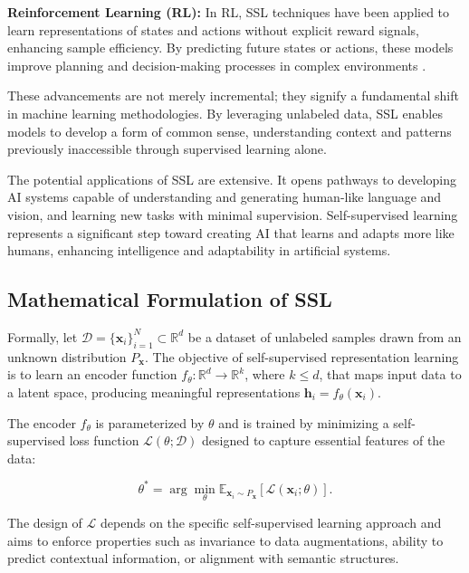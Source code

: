 \textbf{Reinforcement Learning (RL):} In RL, SSL techniques have been applied to learn representations of states and actions without explicit reward signals, enhancing sample efficiency. By predicting future states or actions, these models improve planning and decision-making processes in complex environments \citep{schwarzer2021pretraining}.

These advancements are not merely incremental; they signify a fundamental shift in machine learning methodologies. By leveraging unlabeled data, SSL enables models to develop a form of common sense, understanding context and patterns previously inaccessible through supervised learning alone.

The potential applications of SSL are extensive. It opens pathways to developing AI systems capable of understanding and generating human-like language and vision, and learning new tasks with minimal supervision. Self-supervised learning represents a significant step toward creating AI that learns and adapts more like humans, enhancing intelligence and adaptability in artificial systems.



\subsection{Mathematical Formulation of SSL}

Formally, let \( \mathcal{D} = \{ \mathbf{x}_i \}_{i=1}^N \subset \mathbb{R}^d \) be a dataset of unlabeled samples drawn from an unknown distribution \( P_{\mathbf{x}} \). The objective of self-supervised representation learning is to learn an encoder function \( f_{\theta} : \mathbb{R}^d \rightarrow \mathbb{R}^k \), where \( k \leq d \), that maps input data to a latent space, producing meaningful representations \( \mathbf{h}_i = f_{\theta}(\mathbf{x}_i) \).

The encoder \( f_{\theta} \) is parameterized by \( \theta \) and is trained by minimizing a self-supervised loss function \( \mathcal{L}(\theta; \mathcal{D}) \) designed to capture essential features of the data:

\[
\theta^* = \arg \min_{\theta} \mathbb{E}_{\mathbf{x}_i \sim P_{\mathbf{x}}} [\mathcal{L}(\mathbf{x}_i; \theta)].
\]

The design of \( \mathcal{L} \) depends on the specific self-supervised learning approach and aims to enforce properties such as invariance to data augmentations, ability to predict contextual information, or alignment with semantic structures.

